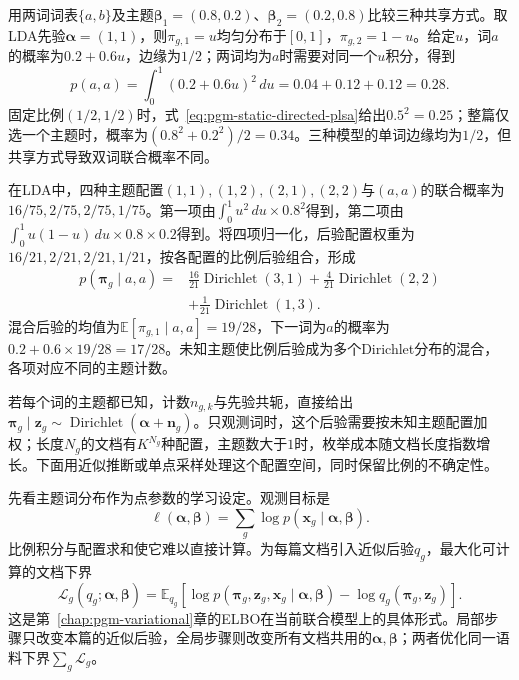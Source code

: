 \begin{example}
  \label{ex:pgm-static-directed-lda-two-words}
  用两词词表$\{a,b\}$及主题$\bm\beta_1=(0.8,0.2)$、$\bm\beta_2=(0.2,0.8)$比较三种共享方式。取LDA先验$\bm\alpha=(1,1)$，则$\pi_{g,1}=u$均匀分布于$[0,1]$，$\pi_{g,2}=1-u$。给定$u$，词$a$的概率为$0.2+0.6u$，边缘为$1/2$；两词均为$a$时需要对同一个$u$积分，得到
  \[
    p(a,a)=\int_0^1(0.2+0.6u)^2\,du
      =0.04+0.12+0.12=0.28.
  \]
  固定比例$(1/2,1/2)$时，式~\eqref{eq:pgm-static-directed-plsa}给出$0.5^2=0.25$；整篇仅选一个主题时，概率为$(0.8^2+0.2^2)/2=0.34$。三种模型的单词边缘均为$1/2$，但共享方式导致双词联合概率不同。

  在LDA中，四种主题配置$(1,1),(1,2),(2,1),(2,2)$与$(a,a)$的联合概率为$16/75,2/75,2/75,1/75$。第一项由$\int_0^1u^2\,du\times0.8^2$得到，第二项由$\int_0^1u(1-u)\,du\times0.8\times0.2$得到。将四项归一化，后验配置权重为$16/21,2/21,2/21,1/21$，按各配置的比例后验组合，形成
  \[
    \begin{aligned}
      p(\bm{\pi}_g\mid a,a)
        ={}&\frac{16}{21}\operatorname{Dirichlet}(3,1)
           +\frac{4}{21}\operatorname{Dirichlet}(2,2)\\
           &+\frac{1}{21}\operatorname{Dirichlet}(1,3).
    \end{aligned}
  \]
  混合后验的均值为$\mathbb E[\pi_{g,1}\mid a,a]=19/28$，下一词为$a$的概率为$0.2+0.6\times19/28=17/28$。未知主题使比例后验成为多个Dirichlet分布的混合，各项对应不同的主题计数。
\end{example}

若每个词的主题都已知，计数$n_{g,k}$与先验共轭，直接给出$\bm\pi_g\mid\bm z_g\sim\operatorname{Dirichlet}(\bm\alpha+\bm n_g)$。只观测词时，这个后验需要按未知主题配置加权；长度$N_g$的文档有$K^{N_g}$种配置，主题数大于$1$时，枚举成本随文档长度指数增长。下面用近似推断或单点采样处理这个配置空间，同时保留比例的不确定性。

先看主题词分布作为点参数的学习设定。观测目标是
\[
 \ell(\bm\alpha,\bm\beta)
   =\sum_g\log p(\bm x_g\mid\bm\alpha,\bm\beta).
\]
比例积分与配置求和使它难以直接计算。为每篇文档引入近似后验$q_g$，最大化可计算的文档下界
\begin{equation}
 \mathcal L_g(q_g;\bm\alpha,\bm\beta)
 =\mathbb E_{q_g}[\log p(\bm\pi_g,\bm z_g,\bm x_g
                        \mid\bm\alpha,\bm\beta)-\log q_g(\bm\pi_g,\bm z_g)].
 \label{eq:pgm-static-directed-lda-elbo}
\end{equation}
这是第~\ref{chap:pgm-variational}章的ELBO在当前联合模型上的具体形式。局部步骤只改变本篇的近似后验，全局步骤则改变所有文档共用的$\bm\alpha,\bm\beta$；两者优化同一语料下界$\sum_g\mathcal L_g$。

